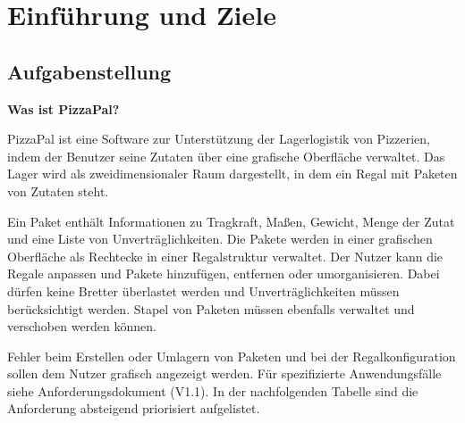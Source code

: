 \section{Einführung und Ziele}
\subsection{Aufgabenstellung}
\textbf{Was ist PizzaPal?}

PizzaPal ist eine Software zur Unterstützung der Lagerlogistik von Pizzerien, indem der Benutzer seine Zutaten über eine grafische Oberfläche verwaltet. Das Lager wird als zweidimensionaler Raum dargestellt, in dem ein Regal mit Paketen von Zutaten steht. \par
Ein Paket enthält Informationen zu Tragkraft, Maßen, Gewicht, Menge der Zutat und eine Liste von Unverträglichkeiten. Die Pakete werden in einer grafischen Oberfläche als Rechtecke in einer Regalstruktur verwaltet. Der Nutzer kann die Regale anpassen und Pakete hinzufügen, entfernen oder umorganisieren. Dabei dürfen keine Bretter überlastet werden und Unverträglichkeiten müssen berücksichtigt werden. Stapel von Paketen müssen ebenfalls verwaltet und verschoben werden können.\par
Fehler beim Erstellen oder Umlagern von Paketen und bei der Regalkonfiguration sollen dem Nutzer grafisch angezeigt werden. Für spezifizierte Anwendungsfälle siehe Anforderungsdokument (V1.1). In der nachfolgenden Tabelle sind die Anforderung absteigend priorisiert aufgelistet.

